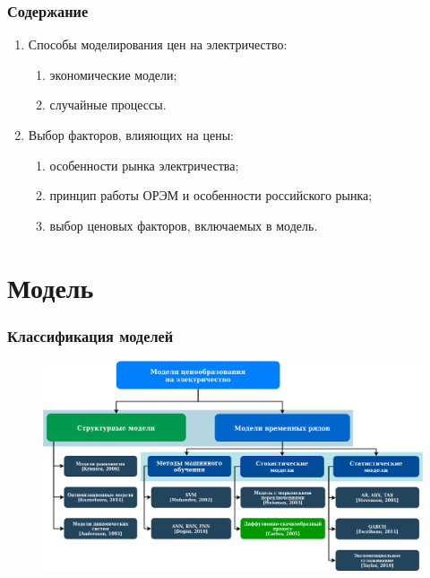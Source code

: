 \documentclass[c, dvipsnames]{beamer}  %
\begin{document}
\begin{frame}[shrink=5]
\frametitle{Содержание} 
\begin{enumerate}
	\item Способы моделирования цен на электричество:
	\begin{enumerate}
		\item экономические модели; 
		\item случайные процессы.
	\end{enumerate}
	\item Выбор факторов, влияющих на цены:
	\begin{enumerate}
		\item особенности рынка электричества;
		\item принцип работы ОРЭМ и особенности российского рынка;
		\item выбор ценовых факторов, включаемых в модель.
	\end{enumerate}
\end{enumerate}
\end{frame}



\section{Модель}

\begin{frame}[shrink=5]


\frametitle{Классификация моделей} 

\begin{figure}
	\centering
	\includegraphics[width=1\linewidth]{untitled2}
	\label{fig:untitled-diagram}
\end{figure}


\end{frame}
\end{document}
